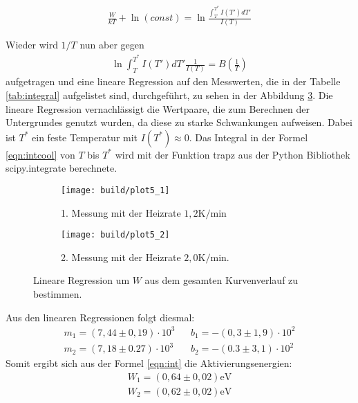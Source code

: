 \begin{align}
  \frac{W}{kT}+\ln{(const)}=\ln \frac{\int_T^{T^*}{I(T')dT'}}{I(T)} \label{eqn:int}
\end{align}

Wieder wird $1/T$ nun aber gegen
\begin{align}
  \ln \int_T^{T^*}I(T')dT'\frac{1}{I(T)}=B(\frac{1}{T}) \label{eqn:intcool}
\end{align}
aufgetragen und eine
lineare Regression auf den Messwerten,
die in der Tabelle \ref{tab:integral} aufgelistet sind,
durchgeführt,
zu sehen in der Abbildung \ref{fig:intreg}.
Die lineare Regression vernachlässigt die Wertpaare,
die zum Berechnen der Untergrundes genutzt wurden,
da diese zu starke Schwankungen aufweisen.
Dabei ist $T^*$ ein feste Temperatur mit $I(T^*)\approx 0$.
Das Integral in der Formel \ref{eqn:intcool} von $T$ bis $T^*$
wird mit der Funktion trapz aus der Python Bibliothek scipy.integrate
berechnete.





\begin{figure}
  \centering
  \begin{subfigure}{0.49\textwidth}
    \centering
    \texttt{[image: build/plot5\_1]}
    \caption{1. Messung mit der Heizrate $1,2 \si{\kelvin\per\minute}$}
    \label{fig:intreg1}
  \end{subfigure}
  \begin{subfigure}{0.49\textwidth}
    \centering
    \texttt{[image: build/plot5\_2]}
    \caption{2. Messung mit der Heizrate $2,0 \si{\kelvin\per\minute}$.}
    \label{fig:intreg2}
  \end{subfigure}
\caption{Lineare Regression um $W$ aus dem gesamten Kurvenverlauf zu bestimmen.}
\label{fig:intreg}
\end{figure}

Aus den linearen Regressionen folgt diesmal:
\begin{align*}
  m_1=(7,44\pm0,19)\cdot10^{3}    &  &b_1=-(0,3\pm1,9)\cdot10^{2}\\
  m_2=(7,18\pm0.27)\cdot10^{3}    &  &b_2=-(0.3\pm3,1)\cdot10^{2}
\end{align*}
Somit ergibt sich aus der Formel \eqref{eqn:int} die Aktivierungsenergien:
\begin{align*}
  W_1=(0,64\pm0,02)\si{\electronvolt}\\
  W_2=(0,62\pm0,02)\si{\electronvolt}
\end{align*}


